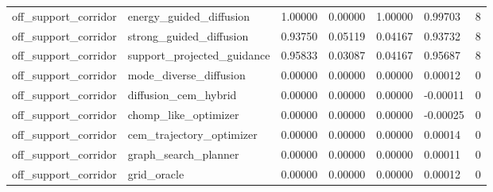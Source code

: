 \documentclass{article}
\begin{document}
\begin{table}[tbp]
{\begin{tabular}{lllllll}
off\_support\_corridor & energy\_guided\_diffusion & 1.00000 & 0.00000 & 1.00000 & 0.99703 & 8 \\
off\_support\_corridor & strong\_guided\_diffusion & 0.93750 & 0.05119 & 0.04167 & 0.93732 & 8 \\
off\_support\_corridor & support\_projected\_guidance & 0.95833 & 0.03087 & 0.04167 & 0.95687 & 8 \\
off\_support\_corridor & mode\_diverse\_diffusion & 0.00000 & 0.00000 & 0.00000 & 0.00012 & 0 \\
off\_support\_corridor & diffusion\_cem\_hybrid & 0.00000 & 0.00000 & 0.00000 & -0.00011 & 0 \\
off\_support\_corridor & chomp\_like\_optimizer & 0.00000 & 0.00000 & 0.00000 & -0.00025 & 0 \\
off\_support\_corridor & cem\_trajectory\_optimizer & 0.00000 & 0.00000 & 0.00000 & 0.00014 & 0 \\
off\_support\_corridor & graph\_search\_planner & 0.00000 & 0.00000 & 0.00000 & 0.00011 & 0 \\
off\_support\_corridor & grid\_oracle & 0.00000 & 0.00000 & 0.00000 & 0.00012 & 0 \\
\bottomrule
\end{tabular}
}
\end{table}
\end{document}
